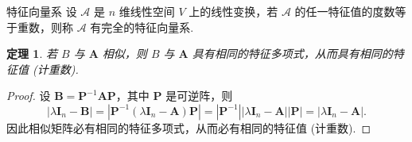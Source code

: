 \documentclass[12pt, a4paper]{ctexart}
\newtheorem{theorem}{\indent 定理}[subsection]
\begin{document}
\begin{definition}{特征向量系}{}
	设 $\mathcal{A}$ 是 $n$ 维线性空间 $V$ 上的线性变换，若 $\mathcal{A}$ 的任一特征值的度数等于重数，则称 $\mathcal{A}$ 有完全的特征向量系. 
\end{definition}
\begin{tcolorbox}[pikachu]
	\begin{theorem}
		若 $B$ 与 $\bm A$ 相似，则 $B$ 与 $\bm A$ 具有相同的特征多项式，从而具有相同的特征值 (计重数). 
	\end{theorem}
\end{tcolorbox}
\begin{proof}
	设 $\bm B = \bm P^{-1}\bm{AP}$，其中 $\bm P$ 是可逆阵，则
	\[ |\lambda \bm I_n -\bm B| = |\bm P^{-1}(\lambda \bm I_n - \bm A)\bm P| = |\bm P^{-1}||\lambda \bm I_n - \bm A||\bm P| = |\lambda\bm I_n -\bm A|. \]
	因此相似矩阵必有相同的特征多项式，从而必有相同的特征值 (计重数). 
\end{proof}
\end{document}
